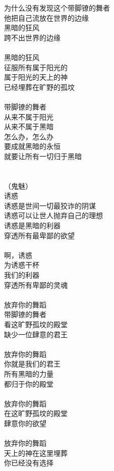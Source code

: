为什么没有发现这个带脚镣的舞者\\
他把自己流放在世界的边缘\\
黑暗的狂风\\
跨不出世界的边缘\\
\\
黑暗的狂风\\
征服所有属于阳光的\\
属于阳光的天上的神\\
已经埋葬在旷野的孤坟\\
\\
带脚镣的舞者\\
从来不属于阳光\\
从来不属于黑暗\\
怎么办，怎么办\\
要成就黑暗的永恒\\
就要让所有一切归于黑暗\\
\\
\\
（鬼魅）\\
诱惑\\
诱惑是世间一切最狡诈的阴谋\\
诱惑可以让世人抛弃自己的理想\\
诱惑是黑暗的利器\\
穿透所有最卑鄙的欲望\\
\\
啊，诱惑\\
为诱惑干杯\\
我们的利器\\
穿透所有卑鄙的灵魂\\
\\
放弃你的舞蹈\\
带脚镣的舞者\\
看这旷野孤坟的殿堂\\
缺少一位肆意的君王\\
\\
放弃你的舞蹈\\
你就是我们的君王\\
所有黑暗的力量\\
都归于你的殿堂\\
\\
放弃你的舞蹈\\
在这旷野孤坟的殿堂\\
肆意你的欲望\\
\\
放弃你的舞蹈\\
天上的神在这里埋葬\\
你已经没有选择\\

